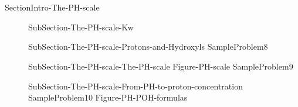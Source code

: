 \documentclass[main.tex]{subfiles}
\begin{document}
\section{\color{blue!30!black}{The PH scale}}{SectionIntro-The-PH-scale}
\sloppy\begin{description}
\item[] {SubSection-The-PH-scale-Kw}
\item[] {SubSection-The-PH-scale-Protons-and-Hydroxyls}
{SampleProblem8}
\item[] {SubSection-The-PH-scale-The-PH-scale}
{Figure-PH-scale}
{SampleProblem9}
\item[] {SubSection-The-PH-scale-From-PH-to-proton-concentration}
{SampleProblem10}
{Figure-PH-POH-formulas}
\end{description}
\end{document}

